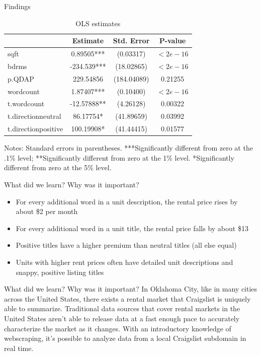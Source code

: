 \documentclass{beamer}
\begin{document}
\begin{frame}{Findings}

\begin{table}[ht]
\caption{OLS estimates}
\centering
\begin{threeparttable}
\begin{tabular}{lccc}
\toprule
                            & Estimate    & Std. Error & P-value \\
\midrule
sqft        & 0.89505***   & (0.03317)    & $<2e-16$    \\
bdrms  & -234.539***   & (18.02865)   & $<2e-16$ \\
p.QDAP        &      229.54856 & (184.04089)  & 0.21255 \\
wordcount     &    1.87407***  & (0.10400)    & $<2e-16$\\
t.wordcount & -12.57888**  & (4.26128) & 0.00322 \\
t.directionneutral & 86.17754* & (41.89659) & 0.03992 \\
t.directionpositive & 100.19908* & (41.44415) & 0.01577 \\
\bottomrule
\end{tabular}
\footnotesize Notes: Standard errors in parentheses. ***Significantly different from zero at the .1\% level; **Significantly different from zero at the 1\% level. *Significantly different from zero at the 5\% level. 
\end{threeparttable}
\end{table}

\end{frame}

\begin{frame}{What did we learn? Why was it important? }
    \begin{itemize}
        \item For every additional word in a unit description, the rental price rises by about \$2 per month
        \item For every additional word in a unit title, the rental price falls by about \$13
        \item Positive titles have a higher premium than neutral titles (all else equal) 
        \item Units with higher rent prices often have detailed unit descriptions and snappy, positive listing titles
       \end{itemize}
\end{frame}

\begin{frame}{What did we learn? Why was it important? }
In Oklahoma City, like in many cities across the United States, there exists a rental market that Craigslist is uniquely able to summarize. Traditional data sources that cover rental markets in the United States aren’t able to release data at a fast enough pace to accurately characterize the market as it changes. With an introductory knowledge of webscraping, it’s possible to analyze data from a local Craigslist subdomain in real time. 
\end{frame}
\end{document}
